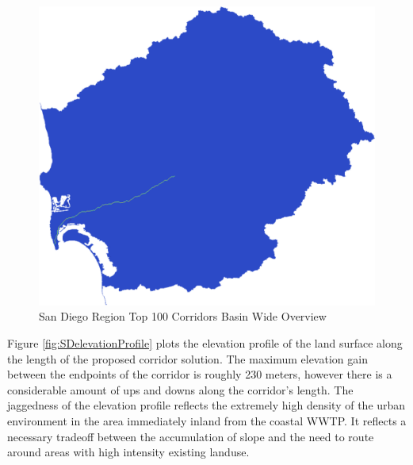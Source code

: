         \begin{figure}[!h]
            \begin{center}
            \includegraphics[width=5.5in]{figures/SanDiego_PathwayLarge.png}   
            \caption{San Diego Region Top 100 Corridors Basin Wide Overview}
            \label{fig:SDsolutionOverview}
            \end{center}
        \end{figure}
        
Figure \ref{fig:SDelevationProfile} plots the elevation profile of the land surface along the length of the proposed corridor solution. The maximum elevation gain between the endpoints of the corridor is roughly 230 meters, however there is a considerable amount of ups and downs along the corridor's length. The jaggedness of the elevation profile reflects the extremely high density of the urban environment in the area immediately inland from the coastal WWTP. It reflects a necessary tradeoff between the accumulation of slope and the need to route around areas with high intensity existing landuse. 
        
